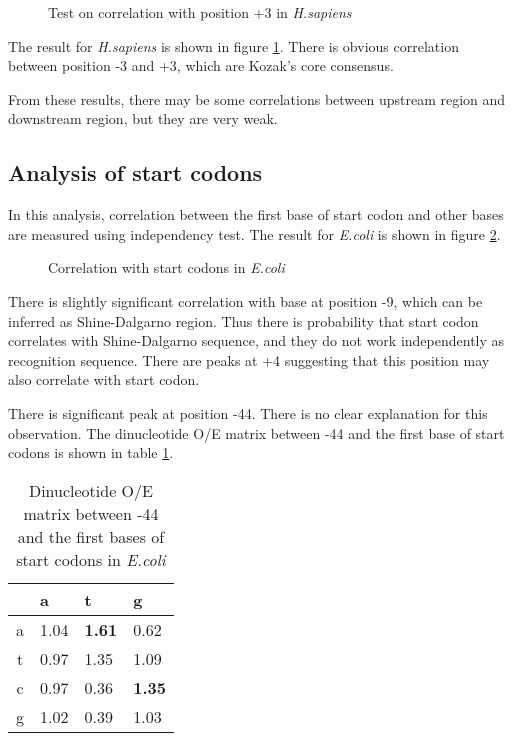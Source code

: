 \begin{figure}
\begin{center}
\end{center}
\caption{Test on correlation with position +3 in {\it H.sapiens}}
\label{hsapupd}
\end{figure}

The result for {\it H.sapiens} is shown in figure \ref{hsapupd}.
There is obvious correlation between position -3 and +3, which are
Kozak's core consensus.

From these results, there may be some correlations
between upstream region and downstream region, but they are very weak.

\subsection{Analysis of start codons}

In this analysis, correlation between the first base of start codon and
other bases are measured using independency test. The result for {\it E.coli}
is shown in figure \ref{ecstart}.

\begin{figure}
\begin{center}
\end{center}
\caption{Correlation with start codons in {\it E.coli}}
\label{ecstart}
\end{figure}

There is slightly significant correlation with base at position -9,
which can be inferred as Shine-Dalgarno region. Thus there is probability
that start codon correlates with Shine-Dalgarno sequence, and they do
not work independently as recognition sequence. There are peaks at +4
suggesting that this position may also correlate with start codon.

There is significant peak at position -44. There is no clear explanation
for this observation. The dinucleotide O/E matrix between -44 and the
first base of start codons is shown in table \ref{ecstart_44_0}.

\begin{table}
\begin{center}
\begin{tabular}{c|lll}
  &  a  & t   &  g\\
\hline
a & 1.04 & {\bf 1.61} & 0.62\\
t & 0.97 & 1.35 & 1.09\\
c & 0.97 & 0.36 & {\bf 1.35}\\ 
g & 1.02 & 0.39 & 1.03\\
\end{tabular}
\end{center} 
\caption{Dinucleotide O/E matrix between -44 and the first bases of
 start codons in {\it E.coli}}
\label{ecstart_44_0}
\end{table}

